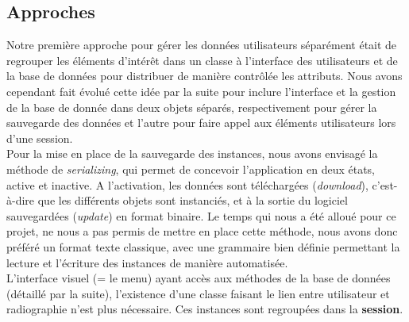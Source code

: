 \documentclass[12pt,a4paper]{article}
\begin{document}
\begin{multicols}{2}
		\subsection{Approches}
		
		Notre première approche pour gérer les données utilisateurs séparément était de regrouper les éléments d'intérêt dans un classe à l'interface des utilisateurs et de la base de données pour distribuer de manière contrôlée les attributs. Nous avons cependant fait évolué cette idée par la suite pour inclure l'interface et la gestion de la base de donnée dans deux objets séparés, respectivement pour gérer la sauvegarde des données et l'autre pour faire appel aux éléments utilisateurs lors d'une session. \\
				
		Pour la mise en place de la sauvegarde des instances, nous avons envisagé la méthode de \textit{serializing}, qui permet de concevoir l'application en deux états, active et inactive. A l'activation, les données sont téléchargées (\textit{download}), c'est-à-dire que les différents objets sont instanciés, et à la sortie du logiciel sauvegardées (\textit{update}) en format binaire. Le temps qui nous a été alloué pour ce projet, ne nous a pas permis de mettre en place cette méthode, nous avons donc préféré un format texte classique, avec une grammaire bien définie permettant la lecture et l'écriture des instances de manière automatisée.\\
				
		L'interface visuel (= le \og menu\fg{}) ayant accès aux méthodes de la base de données (détaillé par la suite), l'existence d'une classe faisant le lien entre utilisateur et radiographie n'est plus nécessaire. Ces instances sont regroupées dans la \textbf{session}.
		
		
		
	\end{multicols}
	
\end{document}
